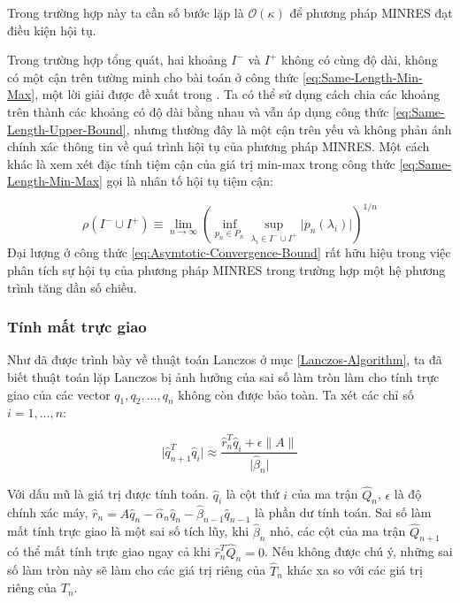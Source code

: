 \documentclass[14pt, a4paper]{article}
\numberwithin{equation}{section}
\numberwithin{algorithm}{section}
\numberwithin{figure}{section}
\numberwithin{dl}{section}
\numberwithin{md}{section}
\numberwithin{bd}{section}
\numberwithin{dn}{section}
\numberwithin{hq}{section}
\begin{document}
\begin{enumerate}[a)]
\begin{itemize}
        Trong trường hợp này ta cần số bước lặp là $\mathcal{O}(\kappa)$ để phương pháp MINRES đạt điều kiện hội tụ.

        Trong trường hợp tổng quát, hai khoảng $I^-$ và $I^+$ không có cùng độ dài, không có một cận trên tường minh cho bài toán ở công thức \ref{eq:Same-Length-Min-Max}, một lời giải được đề xuất trong \cite{fischer2011polynomial}. Ta có thể sử dụng cách chia các khoảng trên thành các khoảng có độ dài bằng nhau và vẫn áp dụng công thức \ref{eq:Same-Length-Upper-Bound}, nhưng thường đây là một cận trên yếu và không phản ánh chính xác thông tin về quá trình hội tụ của phương pháp MINRES.
        Một cách khác là xem xét đặc tính tiệm cận của giá trị min-max trong công thức \ref{eq:Same-Length-Min-Max} gọi là nhân tố hội tụ tiệm cận:

        \begin{equation} \label{eq:Asymtotic-Convergence-Bound}
            \rho(I^- \cup I^+) \equiv \lim_{n \rightarrow \infty} (\inf_{p_n \in P_n} \sup_{\lambda_i \in I^- \cup I^+} \lvert p_n(\lambda_i) \rvert)^{1/n}
        \end{equation}
        Đại lượng ở công thức \ref{eq:Asymtotic-Convergence-Bound} rất hữu hiệu trong việc phân tích sự hội tụ của phương pháp MINRES trong trường hợp một hệ phương trình tăng dần số chiều.

    \end{itemize}
\end{enumerate}

\subsubsection{Tính mất trực giao}

Như đã được trình bày về thuật toán Lanczos ở mục \ref{Lanczos-Algorithm}, ta đã biết thuật toán lặp Lanczos bị ảnh hưởng của sai số làm tròn làm cho tính trực giao của các vector $q_1, q_2, \dots, q_n$ không còn được bảo toàn. Ta xét các chỉ số $i=1, \dots, n$:

\begin{equation}
    \lvert \hat{q}_{n+1}^T \hat{q}_i \rvert \approx \dfrac{\hat{r}_n^T \hat{q}_i + \epsilon \lVert A \rVert}{\lvert \hat{\beta}_n \rvert}
\end{equation}

Với dấu mũ là giá trị được tính toán. $\hat{q}_i$ là cột thứ $i$ của ma trận $\hat{Q}_n$, $\epsilon$ là độ chính xác máy, $\hat{r}_n=A\hat{q}_n - \hat{\alpha}_n \hat{q}_n - \hat{\beta}_{n-1} \hat{q}_{n-1} $ là phần dư tính toán. Sai số làm mất tính trực giao là một sai số tích lũy, khi $\hat{\beta}_n$ nhỏ, các cột của ma trận $\hat{Q}_{n+1}$ có thể mất tính trực giao ngay cả khi $\hat{r}_n^T \hat{Q}_n=0$. Nếu không được chú ý, những sai số làm tròn này sẽ làm cho các giá trị riêng của $\hat{T}_n$ khác xa so với các giá trị riêng của $T_n$.
\end{document}
